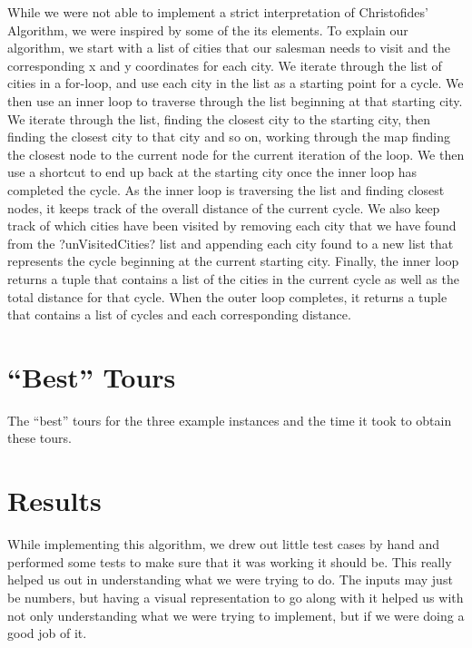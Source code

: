\documentclass[11pt,letterpaper]{article}
\begin{document}
While we were not able to implement a strict interpretation of Christofides' Algorithm, we were inspired by some of the its elements. To explain our algorithm, we start with a list of cities that our salesman needs to visit and the corresponding x and y coordinates for each city. We iterate through the list of cities in a for-loop, and use each city in the list as a starting point for a cycle. We then use an inner loop to traverse through the list beginning at that starting city. We iterate through the list, finding the closest city to the starting city, then finding the closest city to that city and so on, working through the map finding the closest node to the current node for the current iteration of the loop. We then use a shortcut to end up back at the starting city once the inner loop has completed the cycle. As the inner loop is traversing the list and finding closest nodes, it keeps track of the overall distance of the current cycle. We also keep track of which cities have been visited by removing each city that we have found from the ?unVisitedCities? list and appending each city found to a new list that represents the cycle beginning at the current starting city.  Finally, the inner loop returns a tuple that contains a list of the cities in the current cycle as well as the total distance for that cycle. When the outer loop completes, it returns a tuple that contains a list of cycles and each corresponding distance.\vspace{8pt}

\section*{``Best'' Tours}
The ``best'' tours for the three example instances and the time it took to obtain these tours.

\section*{Results}
While implementing this algorithm, we drew out little test cases by hand and performed some tests to make sure that it was working it should be. This really helped us out in understanding what we were trying to do. The inputs may just be numbers, but having a visual representation to go along with it helped us with not only understanding what we were trying to implement, but if we were doing a good job of it.
\end{document}
